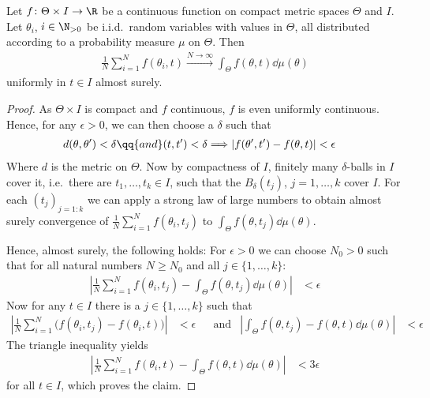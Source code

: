 \begin{lemma}\label{lem:ulln}
Let $f\colon\Theta\times I \to \R$ be a continuous function on compact metric spaces $\Theta$ and $I$.
Let $\theta_i$, $i\in\N_{>0}$ be i.i.d.\ random variables with values in $\Theta$,
all distributed according to a probability measure $\mu$ on $\Theta$.
Then
%
\begin{align}
	\frac{1}{N}\sum_{i=1}^N  f(\theta_i, t)
	\xrightarrow{N\to\infty} \int_{\Theta} f(\theta, t) \dd{\mu(\theta)}
\end{align}
%
uniformly in $t\in I$ almost surely.
\end{lemma}

\begin{proof}\label{proof:ulln}
As $\Theta\times I$ is compact and $f$ continuous, $f$ is even uniformly continuous.
Hence, for any $\epsilon>0$, we can then choose a $\delta$ such that
%
\begin{align}
	d(\theta,\theta') < \delta
	\qq{and}
	(t,t')<\delta
	&\Longrightarrow \left|f(\theta',t')-f(\theta,t)\right|<\epsilon
\end{align}
%
Where $d$ is the metric on $\Theta$.
Now by compactness of $I$, finitely many $\delta$-balls in $I$ cover it,
i.e.\ there are ${t_1, \ldots, t_k\in I}$, such that the $B_\delta(t_j)$, ${j=1, \ldots, k}$ cover $I$.
For each $(t_j)_{j=1:k}$ we can apply a strong law of large numbers to obtain almost surely convergence of ${\frac{1}{N} \sum_{i=1}^N f(\theta_i, t_j)}$ to ${\int_{\Theta} f(\theta, t_j) \dd{\mu(\theta)}}$.

Hence, almost surely, the following holds: For $\epsilon>0$ we can choose $N_0>0$ such that
for all natural numbers $N\geq N_0$ and all $j\in\{1, \ldots, k\}$:
%
\begin{align}
	\left|
		\frac{1}{N} \sum_{i=1}^N f(\theta_i, t_j)
		- \int_{\Theta} f(\theta, t_j) \dd{\mu(\theta)}
	\right|
	&<\epsilon
\end{align}
%
Now for any $t\in I$ there is a $j\in\{1, \ldots, k\}$ such that
%
\begin{align}
	\left|\frac{1}{N} \sum_{i=1}^N \bigl(f(\theta_i, t_j) - f(\theta_i, t)\bigr)\right| &< \epsilon
	&&\text{and}&
	\left| \int_{\Theta} f(\theta, t_j) - f(\theta,t) \dd{\mu(\theta)}\right| &< \epsilon
\end{align}
%
The triangle inequality yields
%
\begin{align}
	\left|
		\frac{1}{N} \sum_{i=1}^N  f(\theta_i, t)
		-  \int_{\Theta} f(\theta, t) \dd{\mu(\theta)}
	\right|
	&< 3\epsilon
\end{align}
%
for all $t\in I$, which proves the claim.
\end{proof}


